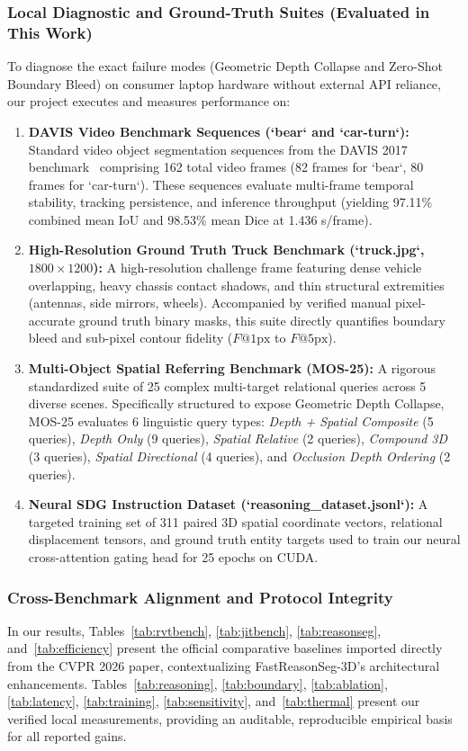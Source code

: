 \documentclass[10pt,twocolumn,letterpaper]{article}
\begin{document}
\subsubsection{Local Diagnostic and Ground-Truth Suites (Evaluated in This Work)}
To diagnose the exact failure modes (Geometric Depth Collapse and Zero-Shot Boundary Bleed) on consumer laptop hardware without external API reliance, our project executes and measures performance on:
\begin{enumerate}[leftmargin=*,itemsep=1pt,topsep=1pt]
    \item \textbf{DAVIS Video Benchmark Sequences (`bear` and `car-turn`):} Standard video object segmentation sequences from the DAVIS 2017 benchmark~\cite{perazzi2016benchmark,pont2016davis} comprising 162 total video frames (82 frames for `bear`, 80 frames for `car-turn`). These sequences evaluate multi-frame temporal stability, tracking persistence, and inference throughput (yielding 97.11\% combined mean IoU and 98.53\% mean Dice at 1.436 s/frame).
    \item \textbf{High-Resolution Ground Truth Truck Benchmark (`truck.jpg`, $1800 \times 1200$):} A high-resolution challenge frame featuring dense vehicle overlapping, heavy chassis contact shadows, and thin structural extremities (antennas, side mirrors, wheels). Accompanied by verified manual pixel-accurate ground truth binary masks, this suite directly quantifies boundary bleed and sub-pixel contour fidelity ($F@1\text{px}$ to $F@5\text{px}$).
    \item \textbf{Multi-Object Spatial Referring Benchmark (MOS-25):} A rigorous standardized suite of 25 complex multi-target relational queries across 5 diverse scenes. Specifically structured to expose Geometric Depth Collapse, MOS-25 evaluates 6 linguistic query types: \textit{Depth + Spatial Composite} (5 queries), \textit{Depth Only} (9 queries), \textit{Spatial Relative} (2 queries), \textit{Compound 3D} (3 queries), \textit{Spatial Directional} (4 queries), and \textit{Occlusion Depth Ordering} (2 queries).
    \item \textbf{Neural SDG Instruction Dataset (`reasoning_dataset.jsonl`):} A targeted training set of 311 paired 3D spatial coordinate vectors, relational displacement tensors, and ground truth entity targets used to train our neural cross-attention gating head for 25 epochs on CUDA.
\end{enumerate}

\subsubsection{Cross-Benchmark Alignment and Protocol Integrity}
In our results, Tables~\ref{tab:rvtbench}, \ref{tab:jitbench}, \ref{tab:reasonseg}, and~\ref{tab:efficiency} present the official comparative baselines imported directly from the CVPR 2026 paper, contextualizing FastReasonSeg-3D's architectural enhancements. Tables~\ref{tab:reasoning}, \ref{tab:boundary}, \ref{tab:ablation}, \ref{tab:latency}, \ref{tab:training}, \ref{tab:sensitivity}, and~\ref{tab:thermal} present our verified local measurements, providing an auditable, reproducible empirical basis for all reported gains.
\end{document}
